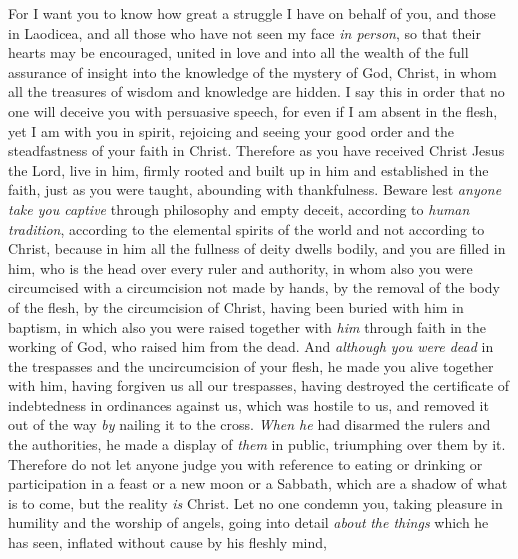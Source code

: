 \begin{biblechapter} %
 For I want you to know how great a struggle I have on behalf of you, and those in Laodicea, and all those who have not seen my face \textit{in person},
\verse so that their hearts may be encouraged, united in love and into all the wealth of the full assurance of insight into the knowledge of the mystery of God, Christ,
\verse in whom all the treasures of wisdom and knowledge are hidden.
\verse I say this in order that no one will deceive you with persuasive speech,
\verse for even if I am absent in the flesh, yet I am with you in spirit, rejoicing and seeing your good order and the steadfastness of your faith in Christ.
 Therefore as you have received Christ Jesus the Lord, live in him,
\verse firmly rooted and built up in him and established in the faith, just as you were taught, abounding with thankfulness.
\verse Beware lest \textit{anyone take you captive} through philosophy and empty deceit, according to \textit{human tradition}, according to the elemental spirits of the world and not according to Christ,
\verse because in him all the fullness of deity dwells bodily,
\verse and you are filled in him, who is the head over every ruler and authority,
\verse in whom also you were circumcised with a circumcision not made by hands, by the removal of the body of the flesh, by the circumcision of Christ,
\verse having been buried with him in baptism, in which also you were raised together with \textit{him} through faith in the working of God, who raised him from the dead.
\verse And \textit{although you were dead} in the trespasses and the uncircumcision of your flesh, he made you alive together with him, having forgiven us all our trespasses,
\verse having destroyed the certificate of indebtedness in ordinances against us, which was hostile to us, and removed it out of the way \textit{by} nailing it to the cross.
\verse \textit{When he} had disarmed the rulers and the authorities, he made a display of \textit{them} in public, triumphing over them by it.
 Therefore do not let anyone judge you with reference to eating or drinking or participation in a feast or a new moon or a Sabbath,
\verse which are a shadow of what is to come, but the reality \textit{is} Christ.
\verse Let no one condemn you, taking pleasure in humility and the worship of angels, going into detail \textit{about} \textit{the things} which he has seen, inflated without cause by his fleshly mind,

\end{biblechapter}
